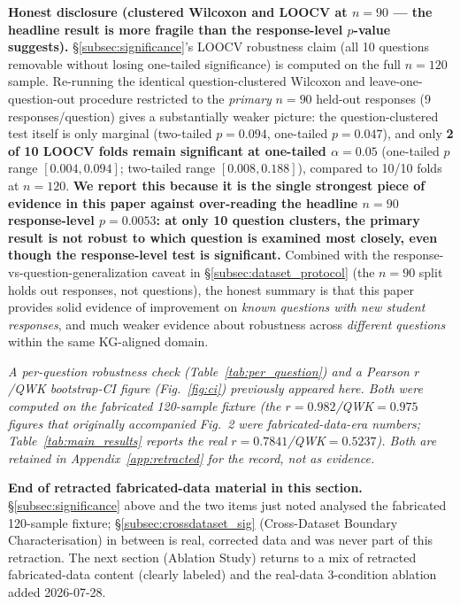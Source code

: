 \documentclass[conference]{IEEEtran}
\begin{document}
\textbf{Honest disclosure (clustered Wilcoxon and LOOCV at $n=90$ ---
the headline result is more fragile than the response-level $p$-value
suggests).} \S\ref{subsec:significance}'s LOOCV robustness claim (all 10
questions removable without losing one-tailed significance) is computed
on the full $n=120$ sample. Re-running the identical question-clustered
Wilcoxon and leave-one-question-out procedure restricted to the
\emph{primary} $n=90$ held-out responses (9 responses/question) gives a
substantially weaker picture: the question-clustered test itself is only
marginal (two-tailed $p = 0.094$, one-tailed $p = 0.047$), and only
\textbf{2 of 10 LOOCV folds remain significant at one-tailed
$\alpha=0.05$} (one-tailed $p$ range $[0.004, 0.094]$; two-tailed range
$[0.008, 0.188]$), compared to 10/10 folds at $n=120$. \textbf{We report
this because it is the single strongest piece of evidence in this paper
against over-reading the headline $n=90$ response-level $p=0.0053$: at
only 10 question clusters, the primary result is not robust to which
question is examined most closely, even though the response-level test
is significant.} Combined with the response-vs-question-generalization
caveat in \S\ref{subsec:dataset_protocol} (the $n=90$ split holds out
responses, not questions), the honest summary is that this paper
provides solid evidence of improvement on \emph{known questions with new
student responses}, and much weaker evidence about robustness across
\emph{different questions} within the same KG-aligned domain.

\textit{A per-question robustness check (Table~\ref{tab:per_question})
and a Pearson $r$/QWK bootstrap-CI figure (Fig.~\ref{fig:ci}) previously
appeared here. Both were computed on the fabricated 120-sample fixture
(the $r=0.982$/QWK$=0.975$ figures that originally accompanied Fig.~2
were fabricated-data-era numbers; Table~\ref{tab:main_results} reports
the real $r=0.7841$/QWK$=0.5237$). Both are retained in
Appendix~\ref{app:retracted} for the record, not as evidence.}

\textbf{End of retracted fabricated-data material in this section.}
\S\ref{subsec:significance} above and the two items just noted
analysed the fabricated 120-sample fixture; \S\ref{subsec:crossdataset_sig}
(Cross-Dataset Boundary Characterisation) in between is real, corrected
data and was never part of this retraction. The next section (Ablation
Study) returns to a mix of retracted fabricated-data content (clearly
labeled) and the real-data 3-condition ablation added 2026-07-28.
\end{document}
